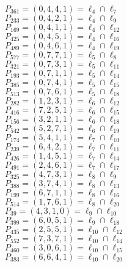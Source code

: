 \documentclass{article}
\begin{document}
{\begin{multicols}{2}
$P_{361} = ( 0, 4, 4, 1 ) = \ell_{4} \cap \ell_{7} $\\
$P_{233} = ( 0, 4, 2, 1 ) = \ell_{4} \cap \ell_{9} $\\
$P_{169} = ( 0, 4, 1, 1 ) = \ell_{4} \cap \ell_{12} $\\
$P_{425} = ( 0, 4, 5, 1 ) = \ell_{4} \cap \ell_{16} $\\
$P_{489} = ( 0, 4, 6, 1 ) = \ell_{4} \cap \ell_{19} $\\
$P_{577} = ( 0, 7, 7, 1 ) = \ell_{5} \cap \ell_{8} $\\
$P_{321} = ( 0, 7, 3, 1 ) = \ell_{5} \cap \ell_{11} $\\
$P_{193} = ( 0, 7, 1, 1 ) = \ell_{5} \cap \ell_{14} $\\
$P_{385} = ( 0, 7, 4, 1 ) = \ell_{5} \cap \ell_{15} $\\
$P_{513} = ( 0, 7, 6, 1 ) = \ell_{5} \cap \ell_{18} $\\
$P_{282} = ( 1, 2, 3, 1 ) = \ell_{6} \cap \ell_{12} $\\
$P_{416} = ( 7, 2, 5, 1 ) = \ell_{6} \cap \ell_{15} $\\
$P_{156} = ( 3, 2, 1, 1 ) = \ell_{6} \cap \ell_{18} $\\
$P_{542} = ( 5, 2, 7, 1 ) = \ell_{6} \cap \ell_{19} $\\
$P_{174} = ( 5, 4, 1, 1 ) = \ell_{7} \cap \ell_{10} $\\
$P_{239} = ( 6, 4, 2, 1 ) = \ell_{7} \cap \ell_{11} $\\
$P_{426} = ( 1, 4, 5, 1 ) = \ell_{7} \cap \ell_{14} $\\
$P_{491} = ( 2, 4, 6, 1 ) = \ell_{7} \cap \ell_{17} $\\
$P_{325} = ( 4, 7, 3, 1 ) = \ell_{8} \cap \ell_{9} $\\
$P_{388} = ( 3, 7, 4, 1 ) = \ell_{8} \cap \ell_{13} $\\
$P_{199} = ( 6, 7, 1, 1 ) = \ell_{8} \cap \ell_{16} $\\
$P_{514} = ( 1, 7, 6, 1 ) = \ell_{8} \cap \ell_{20} $\\
$P_{39} = ( 4, 3, 1, 0 ) = \ell_{9} \cap \ell_{10} $\\
$P_{399} = ( 6, 0, 5, 1 ) = \ell_{9} \cap \ell_{18} $\\
$P_{435} = ( 2, 5, 5, 1 ) = \ell_{10} \cap \ell_{12} $\\
$P_{552} = ( 7, 3, 7, 1 ) = \ell_{10} \cap \ell_{14} $\\
$P_{460} = ( 3, 0, 6, 1 ) = \ell_{10} \cap \ell_{15} $\\
$P_{383} = ( 6, 6, 4, 1 ) = \ell_{10} \cap \ell_{20} $\\

\end{multicols}}
\end{document}
